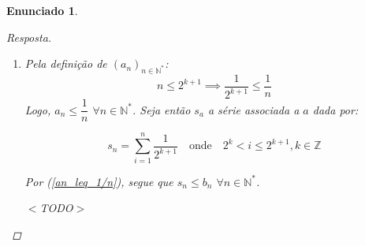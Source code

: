 \documentclass[a4paper,twoside,11pt]{article}
\newtheorem*{enunciado}{Enunciado}
\begin{document}
\begin{enunciado}
\begin{proof}[Resposta]
\begin{enumerate}[label=(\alph*)]
            Mas se $a, b \in \mathbb{Z}$, segue que:
            \begin{enumerate}[label=\arabic*.]
                \item Se $a = b$, então $2^{b-a} = 1$;
                \item Se $a > b$, então $b - a \leq -1 \implies b - a = -1 - k, k \in \mathbb{Z}_{>0}$, e $2^{-1-k} = \frac{1}{2^{k+1}} < 1$;
                \item Se $a < b$, então $b - a \geq 1 \implies b - a = 1 + k, k \in \mathbb{Z}_{>0}$, e $2^{1+k} = 2.2^k > 2$.
            \end{enumerate}
            
            De todo modo, $1 \geq 2^{b-a}$ ou $2^{b-a} > 2$. \Lightning $a$ não é crescente $\implies a$ é não crescente. \qed

            $(b_n)_{n \in \mathbb{N}}$ é crescente se e somente se:
            
            \begin{align*}
                b_{n+1} > b_n &\iff \sum_{k=1}^{n+1} \dfrac{1}{k} > \sum_{k=1}^n \dfrac{1}{k}\\
                &\iff \sum_{k=1}^n \dfrac{1}{k} + \dfrac{1}{n+1} > \sum_{k=1}^n \dfrac{1}{k}
            \end{align*}

            De fato, como $n \in \mathbb{N}^*$, evidentemente $n + 1 \in \mathbb{N}^*$ e, assim, $\dfrac{1}{n+1} > 0$.
            Portanto, segue que $b_{n+1} > b_n$ e assim que $b$ é crescente. \qed

            \item Pela definição de $(a_n)_{n \in \mathbb{N}^*}$:
            \begin{equation}\tag{1}\label{an_leq_1/n}
                n \leq 2^{k + 1} \implies \dfrac{1}{2^{k+1}} \leq \dfrac{1}{n}
            \end{equation}
            Logo, $a_n \leq \dfrac{1}{n}$ $\forall n \in \mathbb{N}^*$.
            Seja então $s_a$ a série associada a $a$ dada por:

            $$s_n = \sum^n_{i=1}\dfrac{1}{2^{k+1}} \quad \text{onde} \quad 2^k < i \leq 2^{k+1}, k \in \mathbb{Z}$$

            Por (\ref{an_leq_1/n}), segue que $s_n \leq b_n$ $\forall n \in \mathbb{N}^*$.

            $<$TODO$>$
            
        \end{enumerate}
    \end{proof}
\end{enunciado}
\end{document}
